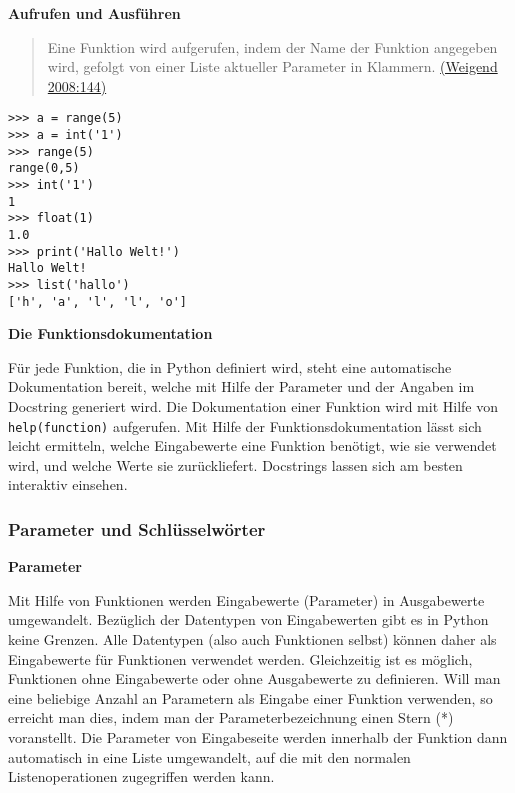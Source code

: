\par\noindent\textbf{Aufrufen und Ausführen}

\begin{quote}
Eine Funktion wird aufgerufen, indem der Name der Funktion angegeben
wird, gefolgt von einer Liste aktueller Parameter in Klammern.
\href{http://bibliography.lingpy.org?key=Weigend2008}{(Weigend
2008:144)}
\end{quote}

\begin{verbatim}
>>> a = range(5)
>>> a = int('1')
>>> range(5)
range(0,5)
>>> int('1')
1
>>> float(1)
1.0
>>> print('Hallo Welt!')
Hallo Welt!
>>> list('hallo')
['h', 'a', 'l', 'l', 'o']
\end{verbatim}




\par\noindent\textbf{Die Funktionsdokumentation}

Für jede Funktion, die in Python definiert wird, steht eine automatische
Dokumentation bereit, welche mit Hilfe der Parameter und der Angaben im
Docstring generiert wird. Die Dokumentation einer Funktion wird mit
Hilfe von \texttt{help(function)} aufgerufen. Mit Hilfe der
Funktionsdokumentation lässt sich leicht ermitteln, welche Eingabewerte
eine Funktion benötigt, wie sie verwendet wird, und welche Werte sie
zurückliefert. Docstrings lassen sich am besten interaktiv einsehen.



\subsubsection{Parameter und Schlüsselwörter}

\par\noindent\textbf{Parameter}

Mit Hilfe von Funktionen werden Eingabewerte (Parameter) in Ausgabewerte
umgewandelt. Bezüglich der Datentypen von Eingabewerten gibt es in
Python keine Grenzen. Alle Datentypen (also auch Funktionen selbst)
können daher als Eingabewerte für Funktionen verwendet werden.
Gleichzeitig ist es möglich, Funktionen ohne Eingabewerte oder ohne
Ausgabewerte zu definieren. Will man eine beliebige Anzahl an Parametern
als Eingabe einer Funktion verwenden, so erreicht man dies, indem man
der Parameterbezeichnung einen Stern (*) voranstellt. Die Parameter von
Eingabeseite werden innerhalb der Funktion dann automatisch in eine
Liste umgewandelt, auf die mit den normalen Listenoperationen
zugegriffen werden kann.




